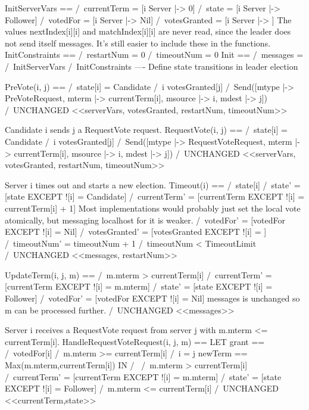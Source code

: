 InitServerVars == /\ currentTerm = [i \in Server |-> 0]
                  /\ state       = [i \in Server |-> Follower]
                  /\ votedFor    = [i \in Server |-> Nil]
                  /\ votesGranted   = [i \in Server |-> {}]
\* The values nextIndex[i][i] and matchIndex[i][i] are never read, since the
\* leader does not send itself messages. It's still easier to include these
\* in the functions.
InitConstraints == /\ restartNum = 0
                   /\ timeoutNum = 0
Init == /\ messages = {}
        /\ InitServerVars
        /\ InitConstraints
----
\* Define state transitions in leader election

PreVote(i, j) ==
    /\ state[i] = Candidate
    /\ i \notin votesGranted[j]
    /\ Send([mtype         |-> PreVoteRequest,
             mterm         |-> currentTerm[i],
             msource       |-> i,
             mdest         |-> j])
    /\ UNCHANGED <<serverVars, votesGranted, restartNum, timeoutNum>>

\* Candidate i sends j a RequestVote request.
RequestVote(i, j) ==
    /\ state[i] = Candidate
    /\ i \notin votesGranted[j]
    /\ Send([mtype         |-> RequestVoteRequest,
             mterm         |-> currentTerm[i],
             msource       |-> i,
             mdest         |-> j])
    /\ UNCHANGED <<serverVars, votesGranted, restartNum, timeoutNum>>
                   
\* Server i times out and starts a new election.
Timeout(i) == /\ state[i] 
              /\ state' = [state EXCEPT ![i] = Candidate]
              /\ currentTerm' = [currentTerm EXCEPT 
                                ![i] = currentTerm[i] + 1]
              \* Most implementations would probably just set the local vote
              \* atomically, but messaging localhost for it is weaker.
              /\ votedFor' = [votedFor EXCEPT ![i] = Nil]
              /\ votesGranted'   = [votesGranted EXCEPT 
                                   ![i] = {}]
              /\ timeoutNum'     = timeoutNum + 1
              /\ timeoutNum      < TimeoutLimit
              /\ UNCHANGED <<messages, restartNum>>

UpdateTerm(i, j, m) ==
    /\ m.mterm > currentTerm[i]
    /\ currentTerm'    = [currentTerm EXCEPT ![i] = m.mterm]
    /\ state'          = [state       EXCEPT ![i] = Follower]
    /\ votedFor'       = [votedFor    EXCEPT ![i] = Nil]
       \* messages is unchanged so m can be processed further.
    /\ UNCHANGED <<messages>>

\* Server i receives a RequestVote request from server j with
\* m.mterm <= currentTerm[i].
HandleRequestVoteRequest(i, j, m) ==
    LET grant == \/ /\ votedFor[i] 
                    /\ m.mterm >= currentTerm[i]
                 \/ /\ i = j
        newTerm == Max({m.mterm,currentTerm[i]})
    IN
       /\ \/ /\ m.mterm > currentTerm[i]
             /\ currentTerm' = [currentTerm EXCEPT ![i] = m.mterm]
             /\ state'       = [state       EXCEPT ![i] = Follower]
          \/ /\ m.mterm <= currentTerm[i]
             /\ UNCHANGED <<currentTerm,state>>
             
